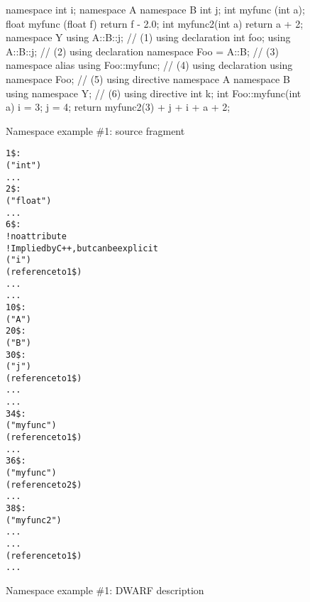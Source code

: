 \begin{figure}[ht]
\begin{nlnlisting}
namespace {
    int i;
}
namespace A {
    namespace B {
        int j;
        int   myfunc (int a);
        float myfunc (float f) { return f - 2.0; }
        int   myfunc2(int a)   { return a + 2; }
    }
}
namespace Y {
    using A::B::j;         // (1) using declaration
    int foo;
}
using A::B::j;             // (2) using declaration
namespace Foo = A::B;      // (3) namespace alias
using Foo::myfunc;         // (4) using declaration
using namespace Foo;       // (5) using directive
namespace A {
    namespace B {
        using namespace Y; // (6) using directive
        int k;
    }
}
int Foo::myfunc(int a)
{
    i = 3;
    j = 4;
    return myfunc2(3) + j + i + a + 2;
}
\end{nlnlisting}
\caption{Namespace example \#1: source fragment}
\label{fig:namespaceexample1sourcefragment}
\end{figure}


\begin{figure}[p]
\begin{dwflisting}
\begin{alltt}

1\$:   \DWTAGbasetype
          \DWATname("int")
          ...
2\$:   \DWTAGbasetype
          \DWATname("float")
          ...
6\$:   \DWTAGnamespace
          ! no \DWATname attribute
          \DWATexportsymbols              ! Implied by C++, but can be explicit
          \DWTAGvariable
              \DWATname("i")
              \DWATtype(reference to 1\$)
              \DWATlocation ...
              ...
10\$:  \DWTAGnamespace
          \DWATname("A")
20\$:      \DWTAGnamespace
              \DWATname("B")
30\$:          \DWTAGvariable
                  \DWATname("j")
                  \DWATtype(reference to 1\$)
                  \DWATlocation ...
                  ...
34\$:          \DWTAGsubprogram
                  \DWATname("myfunc")
                  \DWATtype(reference to 1\$)
                  ...
36\$:          \DWTAGsubprogram
                  \DWATname("myfunc")
                  \DWATtype(reference to 2\$)
                  ...
38\$:          \DWTAGsubprogram
                  \DWATname("myfunc2")
                  \DWATlowpc ...
                  \DWAThighpc ...
                  \DWATtype(reference to 1\$)
                  ...
\end{alltt}
\end{dwflisting}
\caption{Namespace example \#1: DWARF description}
\label{fig:namespaceexample1dwarfdescription}
\end{figure}

